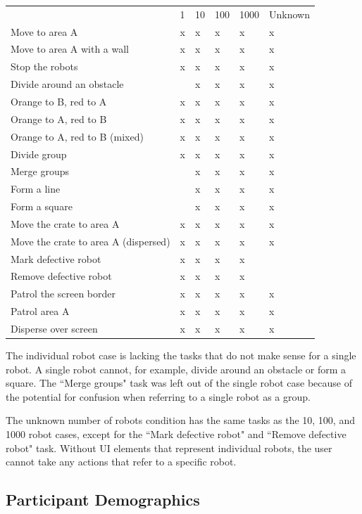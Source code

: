 \begin{tabular}{l|l|l|l|l|l}
	& 1 & 10 & 100 & 1000 & Unknown \\
	Move to area A & x & x & x & x & x\\
	Move to area A with a wall & x & x & x & x & x \\
	Stop the robots & x & x & x & x & x\\
	Divide around an obstacle & & x & x & x & x \\
	Orange to B, red to A & x & x & x & x & x \\
	Orange to A, red to B & x & x & x & x & x \\
	Orange to A, red to B (mixed) & x & x & x & x & x \\
	Divide group & x & x & x & x & x \\
	Merge groups & & x & x & x & x \\
	Form a line & & x & x & x & x \\
	Form a square & & x & x & x & x \\
	Move the crate to area A & x & x & x & x & x \\
	Move the crate to area A (dispersed) & x & x & x & x & x\\
	Mark defective robot & x & x & x & x & \\
	Remove defective robot & x & x & x & x &  \\
	Patrol the screen border & x & x & x & x & x \\
	Patrol area A & x & x & x & x & x \\
	Disperse over screen & x & x & x & x & x \\
\end{tabular}

The individual robot case is lacking the tasks that do not make sense for a single robot. A single robot cannot, for example, divide around an obstacle or form a square. 
The ``Merge groups" task was left out of the single robot case because of the potential for confusion when referring to a single robot as a group. 

The unknown number of robots condition has the same tasks as the 10, 100, and 1000 robot cases, except for the ``Mark defective robot" and ``Remove defective robot" task. 
Without UI elements that represent individual robots, the user cannot take any actions that refer to a specific robot. 



\subsection{Participant Demographics} \label{section:Participant_Demographics}


